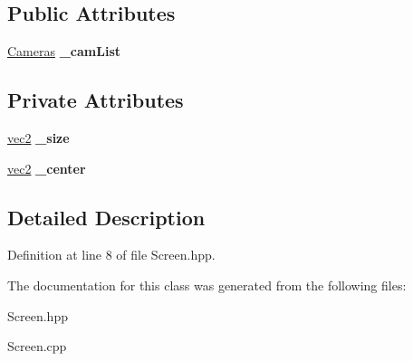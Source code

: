 \subsection*{Public Attributes}
\begin{DoxyCompactItemize}
\item 
\hypertarget{class_screen_a0098c32ec26cba2df8108d7b706986e5}{\hyperlink{class_cameras}{Cameras} {\bfseries \-\_\-cam\-List}}\label{class_screen_a0098c32ec26cba2df8108d7b706986e5}

\end{DoxyCompactItemize}
\subsection*{Private Attributes}
\begin{DoxyCompactItemize}
\item 
\hypertarget{class_screen_a02a1812a3807a9c4db6d4456861a7130}{\hyperlink{struct_angel_1_1vec2}{vec2} {\bfseries \-\_\-size}}\label{class_screen_a02a1812a3807a9c4db6d4456861a7130}

\item 
\hypertarget{class_screen_a1c82610b27dd93ae998b96d1fe11c792}{\hyperlink{struct_angel_1_1vec2}{vec2} {\bfseries \-\_\-center}}\label{class_screen_a1c82610b27dd93ae998b96d1fe11c792}

\end{DoxyCompactItemize}


\subsection{Detailed Description}


Definition at line 8 of file Screen.\-hpp.



The documentation for this class was generated from the following files\-:\begin{DoxyCompactItemize}
\item 
Screen.\-hpp\item 
Screen.\-cpp\end{DoxyCompactItemize}
